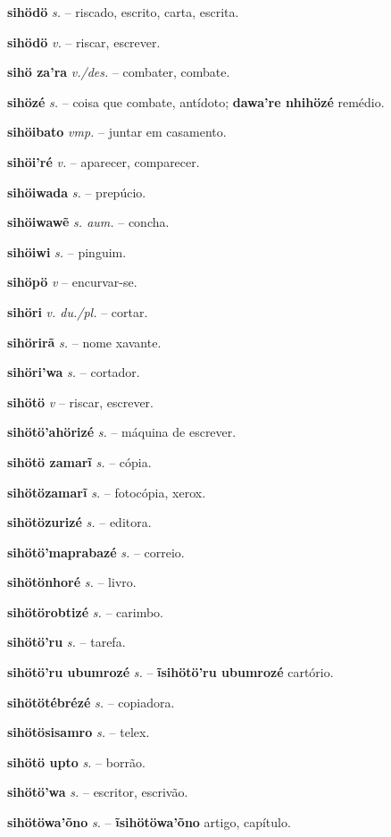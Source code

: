 \textbf{sihödö} \textit{s.} -- riscado, escrito, carta, escrita.

\textbf{sihödö} \textit{v.} -- riscar, escrever.

\textbf{sihö za'ra} \textit{v./des.} -- combater, combate.

\textbf{sihözé} \textit{s.} -- coisa que combate, antídoto; \textbf{dawa're nhihözé} remédio.

\textbf{sihöibato} \textit{vmp.} -- juntar em casamento.

\textbf{sihöi'ré} \textit{v.} -- aparecer, comparecer.

\textbf{sihöiwada} \textit{s.} -- prepúcio.

\textbf{sihöiwawẽ} \textit{s. aum.} -- concha.

\textbf{sihöiwi} \textit{s.} -- pinguim.

\textbf{sihöpö} \textit{v} -- encurvar-se.

\textbf{sihöri} \textit{v. du./pl.} -- cortar.

\textbf{sihörirã} \textit{s.} -- nome xavante.

\textbf{sihöri'wa} \textit{s.} -- cortador.

\textbf{sihötö} \textit{v} -- riscar, escrever.

\textbf{sihötö'ahörizé} \textit{s.} -- máquina de escrever.

\textbf{sihötö zamarĩ} \textit{s.} -- cópia.

\textbf{sihötözamarĩ} \textit{s.} -- fotocópia, xerox.

\textbf{sihötözurizé} \textit{s.} -- editora.

\textbf{sihötö'maprabazé} \textit{s.} -- correio.

\textbf{sihötönhoré} \textit{s.} -- livro.

\textbf{sihötörobtizé} \textit{s.} -- carimbo.

\textbf{sihötö'ru} \textit{s.} -- tarefa.

\textbf{sihötö'ru ubumrozé} \textit{s.} -- \textbf{ĩsihötö'ru ubumrozé} cartório.

\textbf{sihötötébrézé} \textit{s.} -- copiadora.

\textbf{sihötösisamro} \textit{s.} -- telex.

\textbf{sihötö upto} \textit{s.} -- borrão.

\textbf{sihötö'wa} \textit{s.} -- escritor, escrivão.

\textbf{sihötöwa'õno} \textit{s.} -- \textbf{ĩsihötöwa'õno} artigo, capítulo.

